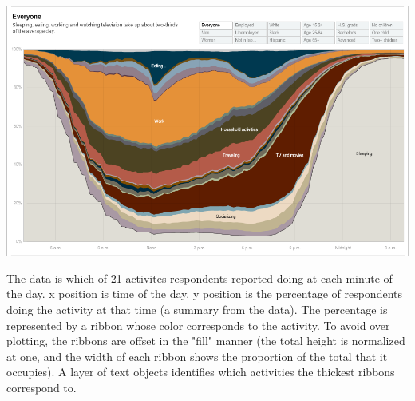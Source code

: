 \documentclass{article}
\begin{document}
  \includegraphics[width=1.0\textwidth]{plots/everyone.png} %

The data is which of 21 activites respondents reported doing at each minute of the day. x position is time of the day. y position is the percentage of respondents doing the activity at that time (a summary from the data). The percentage is represented by a ribbon whose color corresponds to the activity. To avoid over plotting, the ribbons are offset in the "fill" manner (the total height is normalized at one, and the width of each ribbon shows the proportion of the total that it occupies). A layer of text objects identifies which activities the thickest ribbons correspond to.
\end{document}

